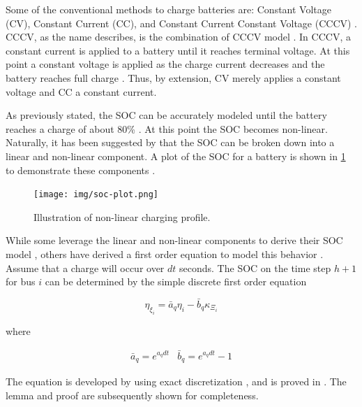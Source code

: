 \documentclass[ee,thesis]{usuthesis}
\begin{document}
Some of the conventional methods to charge batteries are: Constant Voltage (CV), Constant Current (CC), and Constant
Current Constant Voltage (CCCV) \cite{arabsalmanabadi-2018-charg-techn}. CCCV, as the name describes, is the
combination of CCCV model \cite{abdollahi-2016-optim-batter,chen-2008-desig-grey,wang-2021-resear-optim}. In CCCV,
a constant current is applied to a battery until it reaches terminal voltage. At this point a constant voltage is
applied as the charge current decreases and the battery reaches full charge \cite{chen-2008-desig-grey}. Thus, by
extension, CV merely applies a constant voltage and CC a constant current.

As previously stated, the SOC can be accurately modeled until the battery reaches a charge of about 80\%
\cite{liu-2020-batter-elect}. At this point the SOC becomes non-linear. Naturally, it has been suggested by
\cite{zhang-2021-optim-elect} that the SOC can be broken down into a linear and non-linear component. A plot of the SOC
for a battery is shown in \ref{fig:soc-plot} to demonstrate these components \cite{zhang-2021-optim-elect}.

\begin{figure}[htbp]
\centering
\texttt{[image: img/soc-plot.png]}
\caption{\label{fig:soc-plot}Illustration of non-linear charging profile.}
\end{figure}

While some leverage the linear and non-linear components to derive their SOC model \cite{abdollahi-2016-optim-batter},
others have derived a first order equation to model this behavior \cite{whitaker-2023-a-network}. Assume that a charge
will occur over \(dt\) seconds. The SOC on the time step \(h+1\) for bus \(i\) can be determined by the simple discrete first
order equation

\begin{equation}
  \eta_{\xi_i} = \bar{a}_q \eta_i - \bar{b}_q \kappa_{\Xi_i}
\end{equation}

where

\begin{equation}
\begin{array}{cc}
  \bar{a}_q = e^{a_q dt} & \bar{b}_q = e^{a_q dt} - 1
\end{array}
\end{equation}

The equation is developed by using exact discretization \cite{brogan-1990-moder-contr-theor}, and is proved in
\cite{whitaker-2023-a-network}. The lemma and proof are subsequently shown for completeness.
\end{document}

